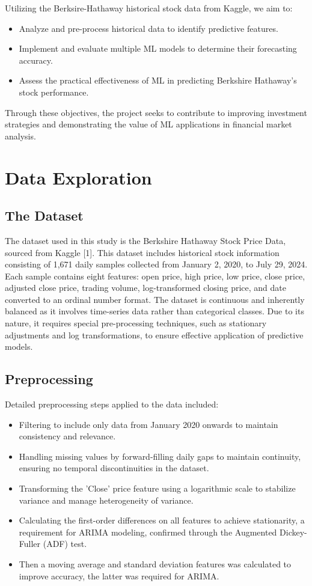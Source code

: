 \documentclass[conference]{IEEEtran}
\begin{document}
Utilizing the Berksire-Hathaway historical stock data from Kaggle, we aim to:
\begin{itemize}
    \item Analyze and pre-process historical data to identify predictive features.
    \item Implement and evaluate multiple ML models to determine their forecasting accuracy.
    \item Assess the practical effectiveness of ML in predicting Berkshire Hathaway’s stock performance.
\end{itemize}

Through these objectives, the project seeks to contribute to improving investment strategies and demonstrating the value of ML applications in financial market analysis.

\section{Data Exploration}

\subsection{The Dataset}

The dataset used in this study is the Berkshire Hathaway Stock Price Data, sourced from Kaggle [1]. This dataset includes historical stock information consisting of 1,671 daily samples collected from January 2, 2020, to July 29, 2024. Each sample contains eight features: open price, high price, low price, close price, adjusted close price, trading volume, log-transformed closing price, and date converted to an ordinal number format. The dataset is continuous and inherently balanced as it involves time-series data rather than categorical classes. Due to its nature, it requires special pre-processing techniques, such as stationary adjustments and log transformations, to ensure effective application of predictive models.

\subsection{Preprocessing}
Detailed preprocessing steps applied to the data included:
\begin{itemize}
    \item Filtering to include only data from January 2020 onwards to maintain consistency and relevance.
    \item Handling missing values by forward-filling daily gaps to maintain continuity, ensuring no temporal discontinuities in the dataset.
    \item Transforming the 'Close' price feature using a logarithmic scale to stabilize variance and manage heterogeneity of variance.
    \item Calculating the first-order differences on all features to achieve stationarity, a requirement for ARIMA modeling, confirmed through the Augmented Dickey-Fuller (ADF) test.
    \item Then a moving average and standard deviation features was calculated to improve accuracy, the latter was required for ARIMA.
\end{itemize}
\end{document}
